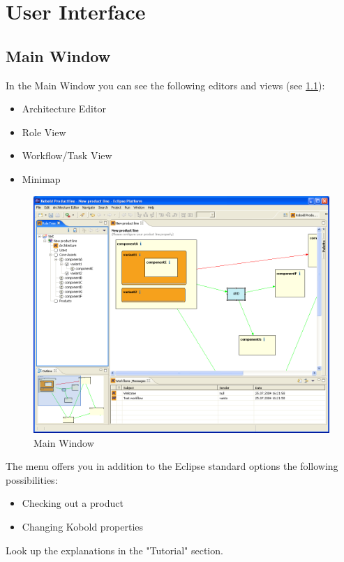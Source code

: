 \chapter{User Interface}

\section{Main Window}
In the Main Window you can see the following editors and views (see \ref{main}):
\begin{itemize}
	\item Architecture Editor
	\item Role View
	\item Workflow/Task View
	\item Minimap
\end{itemize}

\begin{figure}[h!]
\begin{center}
\includegraphics[width=15cm]{main.png}
   \caption{Main Window}
\label{main}
\end{center}
\end{figure}\par

The menu offers you in addition to the Eclipse standard options the following
possibilities:
\begin{itemize}
	\item Checking out a product
	\item Changing Kobold properties
\end{itemize}
Look up the explanations in the "Tutorial" section.


